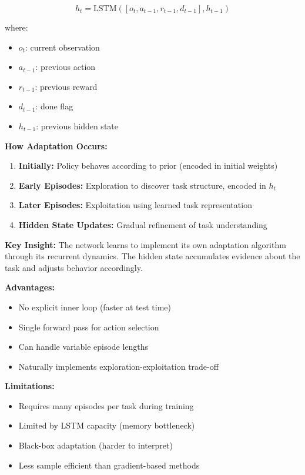 \documentclass[12pt]{article}
\begin{document}
{{			$$h_t = \text{LSTM}([o_t, a_{t-1}, r_{t-1}, d_{t-1}], h_{t-1})$$
			
			where:
			\begin{itemize}
				\item $o_t$: current observation
				\item $a_{t-1}$: previous action
				\item $r_{t-1}$: previous reward
				\item $d_{t-1}$: done flag
				\item $h_{t-1}$: previous hidden state
			\end{itemize}
			
			\textbf{How Adaptation Occurs:}
			
			\begin{enumerate}
				\item \textbf{Initially:} Policy behaves according to prior (encoded in initial weights)
				\item \textbf{Early Episodes:} Exploration to discover task structure, encoded in $h_t$
				\item \textbf{Later Episodes:} Exploitation using learned task representation
				\item \textbf{Hidden State Updates:} Gradual refinement of task understanding
			\end{enumerate}
			
			\textbf{Key Insight:} The network learns to implement its own adaptation algorithm through its recurrent dynamics. The hidden state accumulates evidence about the task and adjusts behavior accordingly.
			
			\textbf{Advantages:}
			\begin{itemize}
				\item No explicit inner loop (faster at test time)
				\item Single forward pass for action selection
				\item Can handle variable episode lengths
				\item Naturally implements exploration-exploitation trade-off
			\end{itemize}
			
			\textbf{Limitations:}
			\begin{itemize}
				\item Requires many episodes per task during training
				\item Limited by LSTM capacity (memory bottleneck)
				\item Black-box adaptation (harder to interpret)
				\item Less sample efficient than gradient-based methods
			\end{itemize}
			
}}
\end{document}
